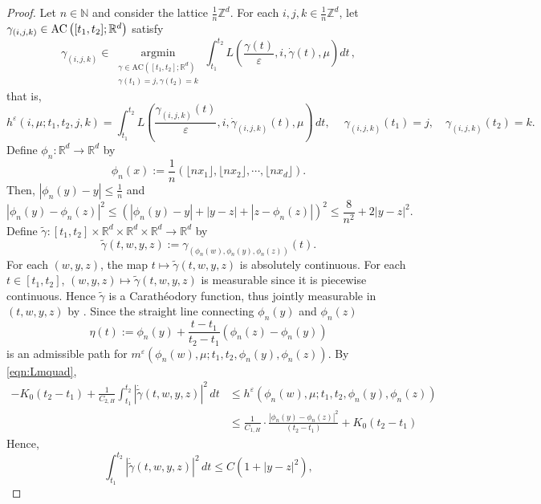 \documentclass[reqno,11pt]{amsart}
\numberwithin{equation}{section}
\newcommand{\R}{\mathbb{R}} %
\newcommand{\ep}{\varepsilon}
\begin{document}
\begin{proof}
Let $n \in \mathbb{N}$ and consider the lattice $\frac{1}{n}\mathbb{Z}^d$. For each $i,j,k \in \frac{1}{n}\mathbb{Z}^d$, let $\gamma_{\left(i,j,k\right)} \in {\rm AC} \left([t_1,t_2];\mathbb{R}^d\right)$ satisfy
\[
\gamma_{\left(i,j,k\right)} \in \operatorname*{argmin}_{\substack{\gamma\in \text{AC}\left([t_1,t_2];\mathbb{R}^d\right)\\
\gamma(t_1)=j,\gamma(t_2)=k}}\int^{t_2}_{t_1}L\left(\frac{\gamma(t)}{\ep}, i, \dot{\gamma}(t),\mu\right)dt\,,
\]
that is,
\[
h^\ep\left(i,\mu;t_1, t_2, j, k\right)=\int_{t_1}^{t_2}
L \left(\frac{\gamma_{\left(i,j,k\right)}(t)}{\varepsilon},i,\dot{\gamma}_{\left(i,j,k\right)}(t),\mu\right)\,dt,\quad\
\gamma_{\left(i,j,k\right)}(t_1)=j,\quad \gamma_{\left(i,j,k\right)}(t_2)=k.
\]
Define $\phi_n:\R^d \to \R^d$ by
\[
\phi_n(x):=\frac{1}{n} \left(\lfloor nx_1\rfloor, \lfloor nx_2\rfloor, \cdots, \lfloor nx_d\rfloor\right).
\]
Then, $\left|\phi_n(y)-y\right|\leq \frac{1}{n}$ and
\begin{equation}\label{eqn:phiest}
\left|\phi_n(y)-\phi_n\left(z\right)\right|^2 \leq \left(\left|\phi_n(y)-y\right|+\left|y-z\right|+\left|z-\phi_n\left(z\right)\right|\right)^2 \leq \frac{8}{n^2} +2\left|y-z\right|^2.
\end{equation}
Define $\tilde{\gamma}:[t_1,t_2]\times\R^d \times \R^d \times \R^d \to \R^d$ by
\[\tilde{\gamma}(t,w,y,z):=\gamma_{\left(\phi_n(w), \phi_n(y),\phi_n(z)\right)}(t).\]
For each $(w,y,z)$, the map $t \mapsto \tilde{\gamma}(t,w,y,z)$ is absolutely continuous. For each $t \in [t_1,t_2]$, $(w,y,z) \mapsto \tilde{\gamma}(t,w,y,z)$ is measurable since it is piecewise continuous. Hence $\tilde{\gamma}$ is a Carath\'eodory function, thus jointly measurable in $(t,w,y,z)$ by \cite[Lemma 4.51]{aliprantis2006infinite}. Since the straight line connecting $\phi_n(y)$ and $\phi_n(z)$
\[
\eta(t):=\phi_n(y)+\frac{t-t_1}{t_2-t_1} \left(\phi_n(z)-\phi_n(y)\right)
\]
is an admissible path for $m^\ep(\phi_n(w),\mu;t_1,t_2,\phi_n(y),\phi_n(z))$. By \eqref{eqn:Lmquad},
\[
\begin{aligned}
-K_0(t_2-t_1)+\frac{1}{C_{2,H}}\int_{t_1}^{t_2} \left|\dot{\tilde{\gamma}}(t,w,y,z)\right|^2\, dt &\leq h^\ep(\phi_n(w),\mu;t_1,t_2,\phi_n(y),\phi_n(z))\\
&\leq \frac{1}{C_{1,H}}\cdot \frac{\left|\phi_n(y)-\phi_n(z)\right|^2}{(t_2-t_1)}+K_0(t_2-t_1)
\end{aligned}
\]
Hence,
\begin{equation} \label{eqn:gammasbd}
      \int_{t_1}^{t_2} \left|\dot{\tilde{\gamma}}(t,w,y,z)\right|^2\, dt\leq C(1+|y-z|^2),

\end{equation}
\end{proof}
\end{document}
